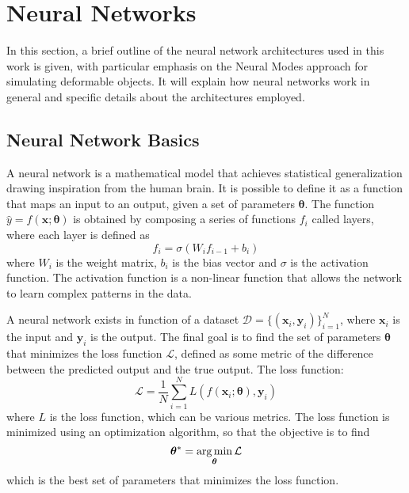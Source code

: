 \section{Neural Networks}
\label{sec:neural_network}

In this section, a brief outline of the neural network architectures used in this work is given, with particular emphasis on the Neural Modes approach for simulating deformable objects. It will explain how neural networks work in general and specific details about the architectures employed.

\subsection{Neural Network Basics}

A neural network is a mathematical model that achieves statistical generalization drawing inspiration from the human brain. It is possible to define it as a function that maps an input to an output, given a set of parameters \( \bm{\theta} \). The function \( \hat{y} = f(\bm{x}; \bm{\theta}) \) is obtained by composing a series of functions \( f_i \) called layers, where each layer is defined as
\begin{equation}
    f_i = \sigma(W_i f_{i-1} + b_i)
\end{equation}
where \( W_i \) is the weight matrix, \( b_i \) is the bias vector and \( \sigma \) is the activation function. The activation function is a non-linear function that allows the network to learn complex patterns in the data. 

A neural network exists in function of a dataset \( \mathcal{D} = \{(\bm{x}_i, \bm{y}_i)\}_{i=1}^N \), where \( \bm{x}_i \) is the input and \( \bm{y}_i \) is the output. The final goal is to find the set of parameters \( \bm{\theta} \) that minimizes the loss function \( \mathcal{L} \), defined as some metric of the difference between the predicted output and the true output. The loss function:
\begin{equation}
    \mathcal{L} = \frac{1}{N} \sum_{i=1}^N L(f(\bm{x}_i; \bm{\theta}), \bm{y}_i)
\end{equation}
where \( L \) is the loss function, which can be various metrics. The loss function is minimized using an optimization algorithm, so that the objective is to find
\begin{equation}
    \bm{\theta}^* = \operatorname*{arg\,min}_{\bm{\theta}} \mathcal{L}
\end{equation}
which is the best set of parameters that minimizes the loss function.


